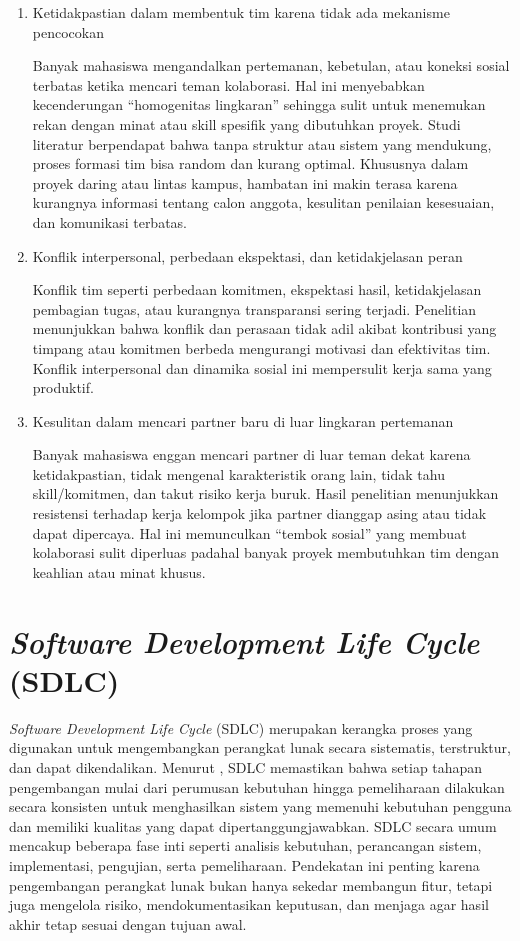 \begin{enumerate}
\item{Ketidakpastian dalam membentuk tim karena tidak ada mekanisme pencocokan}

Banyak mahasiswa mengandalkan pertemanan, kebetulan, atau koneksi sosial terbatas ketika mencari teman kolaborasi. Hal ini menyebabkan kecenderungan “homogenitas lingkaran” sehingga sulit untuk menemukan rekan dengan minat atau skill spesifik yang dibutuhkan proyek. Studi literatur \textcite{darbyMakingGroupWork} berpendapat bahwa tanpa struktur atau sistem yang mendukung, proses formasi tim bisa random dan kurang optimal. Khususnya dalam proyek daring atau lintas kampus, hambatan ini makin terasa karena kurangnya informasi tentang calon anggota, kesulitan penilaian kesesuaian, dan komunikasi terbatas.

\item{Konflik interpersonal, perbedaan ekspektasi, dan ketidakjelasan peran}

Konflik tim seperti perbedaan komitmen, ekspektasi hasil, ketidakjelasan pembagian tugas, atau kurangnya transparansi sering terjadi. Penelitian \textcite{omodanAddressingPotentialConflict2023} menunjukkan bahwa konflik dan perasaan tidak adil akibat kontribusi yang timpang atau komitmen berbeda mengurangi motivasi dan efektivitas tim. Konflik interpersonal dan dinamika sosial ini mempersulit kerja sama yang produktif.

\item{Kesulitan dalam mencari partner baru di luar lingkaran pertemanan}

Banyak mahasiswa enggan mencari partner di luar teman dekat karena ketidakpastian, tidak mengenal karakteristik orang lain, tidak tahu skill/komitmen, dan takut risiko kerja buruk. Hasil penelitian \textcite{pradinaDampakKohesivitasKelompok2024} menunjukkan resistensi terhadap kerja kelompok jika partner dianggap asing atau tidak dapat dipercaya. Hal ini memunculkan “tembok sosial” yang membuat kolaborasi sulit diperluas padahal banyak proyek membutuhkan tim dengan keahlian atau minat khusus.
\end{enumerate}

\section{\textit{Software Development Life Cycle} (SDLC)}
\textit{Software Development Life Cycle} (SDLC) merupakan kerangka proses yang digunakan untuk mengembangkan perangkat lunak secara sistematis, terstruktur, dan dapat dikendalikan. Menurut \textcite{sommervilleSoftwareEngineering2016}, SDLC memastikan bahwa setiap tahapan pengembangan mulai dari perumusan kebutuhan hingga pemeliharaan dilakukan secara konsisten untuk menghasilkan sistem yang memenuhi kebutuhan pengguna dan memiliki kualitas yang dapat dipertanggungjawabkan. SDLC secara umum mencakup beberapa fase inti seperti analisis kebutuhan, perancangan sistem, implementasi, pengujian, serta pemeliharaan. Pendekatan ini penting karena pengembangan perangkat lunak bukan hanya sekedar membangun fitur, tetapi juga mengelola risiko, mendokumentasikan keputusan, dan menjaga agar hasil akhir tetap sesuai dengan tujuan awal. 

